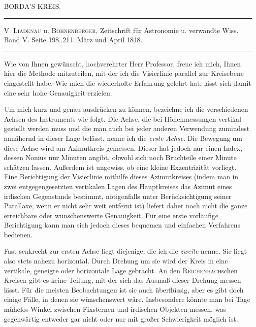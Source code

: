 \clearpage{}\hypertarget{native-409-part-lower}{}\label{native-409-part-lower}
\begin{center}\large BORDA’S KREIS.\end{center}
\begin{center}\hrule\vspace{4pt}\fontsize{10}{12}\selectfont V. \textsc{Liadenau} u. \textsc{Bohnenberger}, Zeitschrift für Astronomie u. verwandte Wiss.\\ Band V. Seite 198..211. März und April 1818.\par\vspace{4pt}\hrule\vspace{4pt}\end{center}
\par\indent Wie von Ihnen gewünscht, hochverehrter Herr Professor, freue ich mich, Ihnen hier die Methode mitzuteilen, mit der ich die Visierlinie parallel zur Kreisebene eingestellt habe. Wie mich die wiederholte Erfahrung gelehrt hat, lässt sich damit eine sehr hohe Genauigkeit erzielen.

\par\indent Um mich kurz und genau ausdrücken zu können, bezeichne ich die verschiedenen Achsen des Instruments wie folgt. Die Achse, die bei Höhenmessungen vertikal gestellt werden muss und die man auch bei jeder anderen Verwendung zumindest annähernd in dieser Lage belässt, nenne ich die \emph{erste Achse}. Die Bewegung um diese Achse wird am Azimutkreis gemessen. Dieser hat jedoch nur einen Index, dessen Nonius nur Minuten angibt, obwohl sich noch Bruchteile einer Minute schätzen lassen. Außerdem ist ungewiss, ob eine kleine Exzentrizität vorliegt. Eine Berichtigung der Visierlinie mithilfe dieses Azimutkreises (indem man in zwei entgegengesetzten vertikalen Lagen des Hauptkreises das Azimut eines irdischen Gegenstands bestimmt, nötigenfalls unter Berücksichtigung seiner Parallaxe, wenn er nicht sehr weit entfernt ist) liefert daher noch nicht die ganze erreichbare oder wünschenswerte Genauigkeit. Für eine erste vorläufige Berichtigung kann man sich jedoch dieses bequemen und einfachen Verfahrens bedienen.

\par\indent Fast senkrecht zur ersten Achse liegt diejenige, die ich die \emph{zweite} nenne. Sie liegt also stets nahezu horizontal. Durch Drehung um sie wird der Kreis in eine vertikale, geneigte oder horizontale Lage gebracht. An den \textsc{Reichenbach}schen Kreisen gibt es keine Teilung, mit der sich das Ausmaß dieser Drehung messen lässt. Für die meisten Beobachtungen ist sie auch überflüssig, aber es gibt doch einige Fälle, in denen sie wünschenswert wäre. Insbesondere könnte man bei Tage mühelos Winkel zwischen Fixsternen und irdischen Objekten messen, was gegenwärtig entweder gar nicht oder nur mit großer Schwierigkeit möglich ist.

